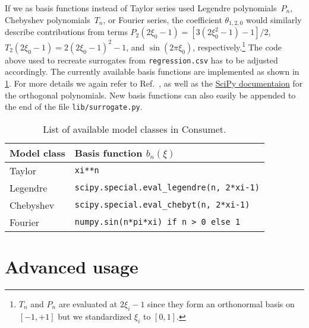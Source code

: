 \documentclass[a4paper,bibliography=numbered]{scrartcl}
\begin{document}
If we as basis functions instead of Taylor series used Legendre polynomials~$P_n$, Chebyshev polynomials~$T_n$, or Fourier series, the coefficient $\theta_{1,2,0}$ would similarly describe contributions from terms $P_2(2\xi_0-1) = [3(2\xi^2_0-1)-1]/2$, $T_2(2\xi_0-1) = 2(2\xi_0-1)^2-1$, and $\sin(2\pi \xi_0)$, respectively.\footnote{$T_n$ and $P_n$ are evaluated at $2\xi_i-1$ since they form an orthonormal basis on $[-1,+1]$ but we standardized $\xi_i$ to $[0,1]$.}
The code above used to recreate surrogates from \texttt{regression.csv} has to be adjusted accordingly.
The currently available basis functions are implemented as shown in \cref{tab:modelclass}.
For more details we again refer to Ref.~\cite{TechPaper}, as well as the \href{https://docs.scipy.org/doc/scipy/reference/special.html}{SciPy documentaion} for the orthogonal polynomials.
New basis functions can also easily be appended to the end of the file \texttt{lib/surrogate.py}.
\begin{table}[h!]
  \begin{center}
    \caption{List of available model classes in Consumet.}
    \label{tab:modelclass}
    \begin{tabular}{ll}
      \toprule
      Model class & Basis function $b_n(\xi)$ \\
      \midrule
      Taylor      & \texttt{xi**n} \\
      Legendre    & \texttt{scipy.special.eval\_legendre(n, 2*xi-1)} \\
      Chebyshev   & \texttt{scipy.special.eval\_chebyt(n, 2*xi-1)} \\
      Fourier     & \texttt{numpy.sin(n*pi*xi) if n > 0 else 1} \\
      \bottomrule
    \end{tabular}
  \end{center}
  \vspace{-3ex}
\end{table}





\section{Advanced usage}
\end{document}
